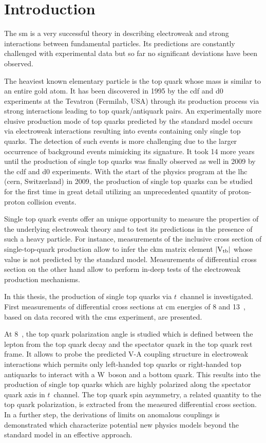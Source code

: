 \chapter*{Introduction}

The \acrlong{sm} is a very successful theory in describing electroweak and strong interactions between fundamental particles. Its predictions are constantly challenged with experimental data but so far no significant deviations have been observed. 

The heaviest known elementary particle is the top quark whose mass is similar to an entire gold atom. It has been discovered in 1995 by the \gls{cdf} and \gls{d0} experiments at the Tevatron (Fermilab, USA) through its production process via strong interactions leading to top quark/antiquark pairs. An experimentally more elusive production mode of top quarks predicted by the standard model occurs via electroweak interactions resulting into events containing only single top quarks. The detection of such events is more challenging due to the larger occurrence of background events mimicking its signature. It took 14 more years until the production of single top quarks was finally observed as well in 2009 by the \gls{cdf} and \gls{d0} experiments. With the start of the physics program at the \gls{lhc} (\gls{cern}, Switzerland) in 2009, the production of single top quarks can be studied for the first time in great detail utilizing an unprecedented quantity of proton-proton collision events.

Single top quark events offer an unique opportunity to measure the properties of the underlying electroweak theory and to test its predictions in the presence of such a heavy particle. For instance, measurements of the inclusive cross section of single-top-quark production allow to infer the \gls{ckm} matrix element $|{\textrm{V}_\textrm{tb}}|$ whose value is not predicted by the standard model. Measurements of differential cross section on the other hand allow to perform in-deep tests of the electroweak production mechanisms.

In this thesis, the production of single top quarks via $t$~channel is investigated.  First measurements of differential cross sections at \acrlong{cm} energies of 8 and 13~\TeV, based on data recored with the \gls{cms} experiment, are presented. 

At 8~\TeV, the top quark polarization angle is studied which is defined between the lepton from the top quark decay and the spectator quark in the top quark rest frame. It allows to probe the predicted V-A coupling structure in electroweak interactions which permits only left-handed top quarks or right-handed top antiquarks to interact with a W~boson and a bottom quark. This results into the production of single top quarks which are highly polarized along the spectator quark axis in $t$~channel. The top quark spin asymmetry, a related quantity to the top quark polarization, is extracted from the measured differential cross section. In a further step, the derivations of limits on anomalous couplings is demonstrated which characterize potential new physics models beyond the standard model in an effective approach.

